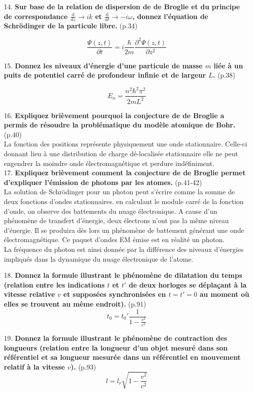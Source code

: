 \documentclass	[11pt, a4paper, openany]{book}
\newcommand{\questpm}[3]{#1. \textbf{#3} (p.#2)}
\newcommand{\dif}{\mathrm{d}}
\begin{document}
\questpm{14}{34}{Sur base de la relation de dispersion de de Broglie et du principe de correspondance $\frac{\dif}{\dif z} \rightarrow ik$ et $\frac{\dif}{\dif t} \rightarrow -i\omega$, donnez l’équation de Schrödinger de la particule libre.}

$$ \dfrac{ \Psi(z,t)}{\partial t} = i\dfrac{\hbar}{2m}\dfrac{\partial^2\Psi(z,t)}{\partial z^2} $$

\questpm{15}{38}{Donnez les niveaux d’énergie d’une particule de masse $m$ liée à un puits de potentiel carré de profondeur infinie et de largeur $L$.}

$$ E_n = \dfrac{n^2\hbar^2\pi^2}{2mL^2} $$

\questpm{16}{40}{Expliquez brièvement pourquoi la conjecture de de Broglie a permis de résoudre la problématique du modèle atomique de Bohr.}
\ \\ La fonction des positions représente physiquement une onde stationnaire. Celle-ci donnant lieu à une distribution de charge dé-localisée stationnaire elle ne peut engendrer la moindre onde électromagnétique et perdure indéfiniment.\\

\questpm{17}{41-42}{Expliquez brièvement comment la conjecture de de Broglie permet d’expliquer l’émission de 
photons par les atomes.}
\ \\ La solution de Schrödinger pour un photon peut s'écrire comme la somme de deux fonctions d'ondes stationnaires. en calculant le module carré de la fonction d'onde, on observe des battements du nuage électronique. A cause d'un phénomène de transfert d'énergie, deux électrons n'ont pas la même niveau d'énergie. Il se produira dès lors un phénomène de battement générant une onde électromagnétique. Ce paquet d'ondes EM émise est en réalité un photon.\\
La fréquence du photon est ainsi donnée par la différence des niveaux d'énergies impliqués dans la dynamique du nuage électronique de l'atome.

\vspace{1cm}

\questpm{18}{91}{Donnez la formule illustrant le phénomène de dilatation du temps (relation entre les indications $t$ et $t'$ de deux horloges se déplaçant à la vitesse relative $v$ et supposées synchronisées en $t = t' = 0$ au moment où elles se trouvent au même endroit).}
$$t_0 = t_0' \frac{1}{1 - \frac{v^2}{c^2}}$$

\questpm{19}{93}{Donnez la formule illustrant le phénomène de contraction des longueurs (relation entre la longueur d’un objet mesuré dans son référentiel et sa longueur mesurée dans un référentiel en mouvement relatif à la vitesse $v$).}
$$l = l_r \sqrt{1 - \frac{v^2}{c^2}}$$
\end{document}
